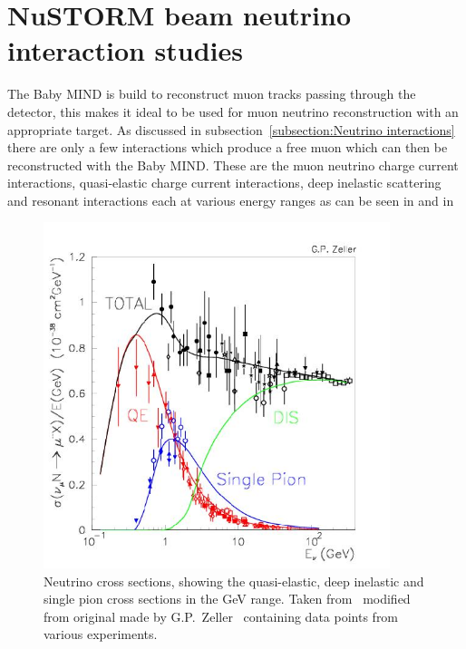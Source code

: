 \chapter{NuSTORM beam neutrino interaction studies}
\label{c:neutrinoNuSTORM}

The Baby MIND is build to reconstruct muon tracks passing through the detector, this makes it ideal to be used for muon neutrino reconstruction with an appropriate target. As discussed in subsection~\ref{subsection:Neutrino interactions} there are only a few interactions which produce a free muon which can then be reconstructed with the Baby MIND. These are the muon neutrino charge current interactions, quasi-elastic charge current interactions, deep inelastic scattering and resonant interactions each at various energy ranges as can be seen in  and in  

\begin{figure}[h!]
\centering
\includegraphics[width=0.9\textwidth]{figures/figs_zeller-total-numode.png}
\caption{Neutrino cross sections, showing the quasi-elastic, deep inelastic and single pion cross sections in the GeV range. Taken from~\cite{82McFarland} modified from original made by G.P.~Zeller~\cite{106Zeller} containing data points from various experiments.}
\label{fig:neutrinoInteractionsFig}
\end{figure}

